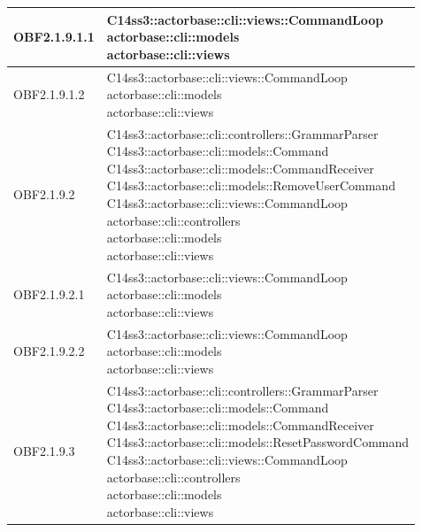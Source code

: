 \documentclass{scalatekids-article}
\begin{document}
\begin{longtable}[H]{|p{4.5cm}|p{13cm}|}
\hline
OBF2.1.9.1.1 & \multiLineCell[t]{C14ss3::actorbase::cli::views::CommandLoop\\actorbase::cli::models\\actorbase::cli::views\\}\\
\hline
OBF2.1.9.1.2 & \multiLineCell[t]{C14ss3::actorbase::cli::views::CommandLoop\\actorbase::cli::models\\actorbase::cli::views\\}\\
\hline
OBF2.1.9.2 & \multiLineCell[t]{C14ss3::actorbase::cli::controllers::GrammarParser\\C14ss3::actorbase::cli::models::Command\\C14ss3::actorbase::cli::models::CommandReceiver\\C14ss3::actorbase::cli::models::RemoveUserCommand\\C14ss3::actorbase::cli::views::CommandLoop\\actorbase::cli::controllers\\actorbase::cli::models\\actorbase::cli::views\\}\\
\hline
OBF2.1.9.2.1 & \multiLineCell[t]{C14ss3::actorbase::cli::views::CommandLoop\\actorbase::cli::models\\actorbase::cli::views\\}\\
\hline
OBF2.1.9.2.2 & \multiLineCell[t]{C14ss3::actorbase::cli::views::CommandLoop\\actorbase::cli::models\\actorbase::cli::views\\}\\
\hline
OBF2.1.9.3 & \multiLineCell[t]{C14ss3::actorbase::cli::controllers::GrammarParser\\C14ss3::actorbase::cli::models::Command\\C14ss3::actorbase::cli::models::CommandReceiver\\C14ss3::actorbase::cli::models::ResetPasswordCommand\\C14ss3::actorbase::cli::views::CommandLoop\\actorbase::cli::controllers\\actorbase::cli::models\\actorbase::cli::views\\}\\

\end{longtable}
\end{document}
